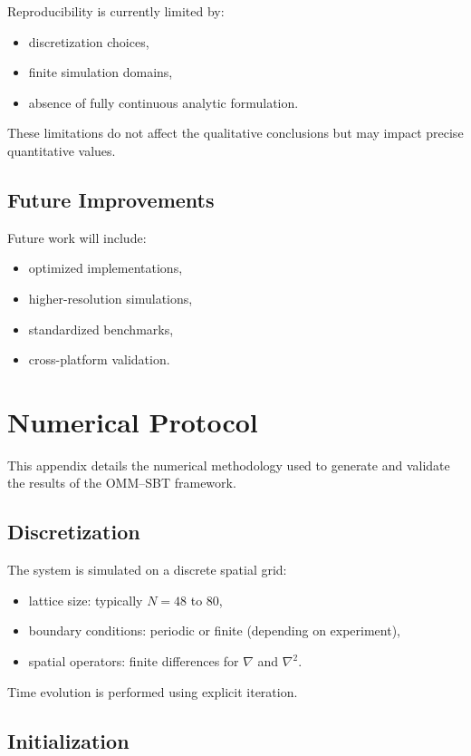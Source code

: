 \documentclass[11pt]{article}
\begin{document}
Reproducibility is currently limited by:

\begin{itemize}
\item discretization choices,
\item finite simulation domains,
\item absence of fully continuous analytic formulation.
\end{itemize}

These limitations do not affect the qualitative conclusions but may impact precise quantitative values.

\subsection{Future Improvements}

Future work will include:

\begin{itemize}
\item optimized implementations,
\item higher-resolution simulations,
\item standardized benchmarks,
\item cross-platform validation.
\end{itemize}

\section{Numerical Protocol}

This appendix details the numerical methodology used to generate and validate the results of the OMM--SBT framework.

\subsection{Discretization}

The system is simulated on a discrete spatial grid:
\begin{itemize}
\item lattice size: typically $N = 48$ to $80$,
\item boundary conditions: periodic or finite (depending on experiment),
\item spatial operators: finite differences for $\nabla$ and $\nabla^2$.
\end{itemize}

Time evolution is performed using explicit iteration.

\subsection{Initialization}
\end{document}
